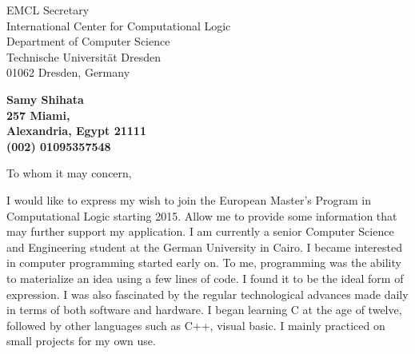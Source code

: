 \documentclass[11pt]{letter} %
\begin{document}

\begin{letter}{
EMCL Secretary \\
International Center for Computational Logic \\
Department of Computer Science\\
Technische Universität Dresden \\
01062 Dresden,
Germany} 


\begin{center}
\large\bf Samy Shihata \\ %
257 Miami, \\ Alexandria, Egypt 21111 \\ (002) 01095357548 %
\end{center} 
\vfill

\signature{Samy Shihata} %


\opening{To whom it may concern,} 
 
  I would like to express my wish to join the European Master's Program in
  Computational Logic starting 2015.
  Allow me to provide some information that may further support my application.
  I am currently a senior Computer Science and Engineering student at the German
  University in Cairo.  I became interested in computer programming started
  early on. To me, programming was the ability to  materialize an idea
  using a few lines of code. I found it to be the ideal form of expression. I
  was also fascinated by the regular technological advances made daily in terms
  of both software and hardware. I began learning C at the age of twelve,
  followed by other languages such as C++, visual basic. I mainly practiced on
  small projects for my own use.  


\end{letter}
\end{document}
